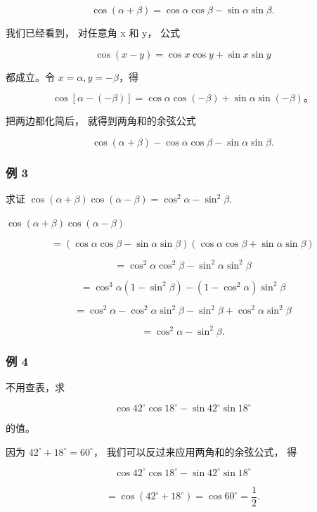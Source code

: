 \[
\cos (\alpha + \beta) = \cos \alpha \cos \beta - \sin \alpha \sin \beta .
\]

 我们已经看到， 对任意角 x 和 y， 公式

\[
\cos (x - y) = \cos x \cos y + \sin x \sin y
\]

都成立。令 \(x = \alpha, y = -\beta\)，得

\[
\cos [ \alpha - (- \beta) ] = \cos \alpha \cos (- \beta) + \sin \alpha \sin (- \beta)\text{。}
\]

把两边都化简后， 就得到两角和的余弦公式

\[
\boxed {\cos (\alpha + \beta) - \cos \alpha \cos \beta - \sin \alpha \sin \beta .}
\]

\subsubsection{例 3}

求证
\(\cos(\alpha+\beta)\cos(\alpha-\beta)=\cos^{2}\alpha-\sin^{2}\beta.\)

 \(\cos (\alpha +\beta)\cos (\alpha -\beta)\)

\[
= (\cos \alpha \cos \beta - \sin \alpha \sin \beta) (\cos \alpha \cos \beta + \sin \alpha \sin \beta)
\]

\[
= \cos^ {2} \alpha \cos^ {2} \beta - \sin^ {2} \alpha \sin^ {2} \beta
\]

\[
= \cos^ {3} \alpha (1 - \sin^ {2} \beta) - (1 - \cos^ {2} \alpha) \sin^ {2} \beta
\]

\[
= \cos^ {2} \alpha - \cos^ {2} \alpha \sin^ {2} \beta - \sin^ {2} \beta + \cos^ {2} \alpha \sin^ {2} \beta
\]

\[
= \cos^ {2} \alpha - \sin^ {2} \beta .
\]

\subsubsection{例 4}

不用查表，求

\[
\cos 42 ^{\circ} \cos 18 ^{\circ} - \sin 42 ^{\circ} \sin 18 ^{\circ}
\]

的值。

 因为 \(42^{\circ} + 18^{\circ} = 60^{\circ}\)，
我们可以反过来应用两角和的余弦公式， 得

\[
\cos 42 ^{\circ} \cos 18 ^{\circ} - \sin 42 ^{\circ} \sin 18 ^{\circ}
\]

\[
= \cos (42 ^{\circ} + 18 ^{\circ}) = \cos 60 ^{\circ} = \frac {1}{2}.
\]

